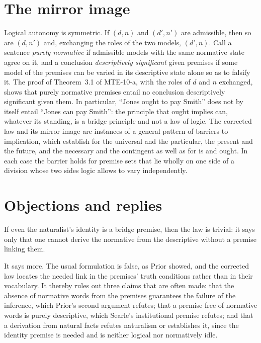 \documentclass{situationist-preprint}
\begin{document}
\section{The mirror image}

Logical autonomy is symmetric. If $(d,n)$ and $(d',n')$ are admissible, then so are $(d,n')$ and, exchanging the roles of the two models, $(d',n)$. Call a sentence \emph{purely normative} if admissible models with the same normative state agree on it, and a conclusion \emph{descriptively significant} given premises if some model of the premises can be varied in its descriptive state alone so as to falsify it. The proof of Theorem~3.1 of MTE-10-a, with the roles of $d$ and $n$ exchanged, shows that purely normative premises entail no conclusion descriptively significant given them. In particular, \enquote{Jones ought to pay Smith} does not by itself entail \enquote{Jones can pay Smith}: the principle that ought implies can, whatever its standing, is a bridge principle and not a law of logic. The corrected law and its mirror image are instances of a general pattern of barriers to implication, which \citet{RussellRestall2010} establish for the universal and the particular, the present and the future, and the necessary and the contingent as well as for is and ought. In each case the barrier holds for premise sets that lie wholly on one side of a division whose two sides logic allows to vary independently.

\section{Objections and replies}

\begin{objection}
If even the naturalist's identity is a bridge premise, then the law is trivial: it says only that one cannot derive the normative from the descriptive without a premise linking them.
\end{objection}

\begin{reply}
It says more. The usual formulation is false, as Prior showed, and the corrected law locates the needed link in the premises' truth conditions rather than in their vocabulary. It thereby rules out three claims that are often made: that the absence of normative words from the premises guarantees the failure of the inference, which Prior's second argument refutes; that a premise free of normative words is purely descriptive, which Searle's institutional premise refutes; and that a derivation from natural facts refutes naturalism or establishes it, since the identity premise is needed and is neither logical nor normatively idle.
\end{reply}
\end{document}
